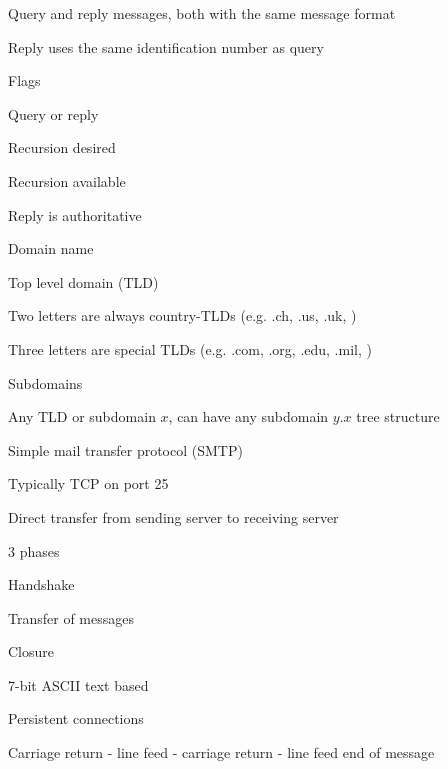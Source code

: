 			\item Query and reply messages, both with the same message format
			\item Reply uses the same identification number as query
			\\ 
			\item Flags
			\enumstart
				\item Query or reply
				\item Recursion desired
				\item Recursion available
				\item Reply is authoritative
			\enumend
		\enumend
	\enumend
	\item Domain name
	\enumstart
		\item Top level domain (TLD)
		\enumstart
			\item Two letters are always country-TLDs (e.g. .ch, .us, .uk, \ddd)
			\item Three letters are special TLDs (e.g. .com, .org, .edu, .mil, \ddd)
		\enumend
		\item Subdomains
		\enumstart
			\item Any TLD or subdomain $x$, can have any subdomain $y.x$ \arrow tree structure
		\enumend
	\enumend
	\item Simple mail transfer protocol (SMTP)
	\enumstart
		\item Typically TCP on port 25
		\item Direct transfer from sending server to receiving server
		\item 3 phases
		\enumstart
			\item Handshake
			\item Transfer of messages
			\item Closure
		\enumend
		\item 7-bit ASCII text based
		\item Persistent connections
		\item Carriage return - line feed - carriage return - line feed \arrow end of message
	\enumend
\enumend
